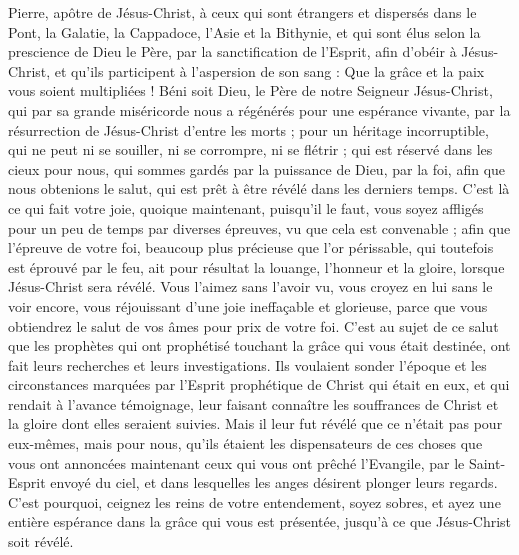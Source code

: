 \begin{multicols}{2}
\TextTitle{[Introduction]}
\VerseOne{}Pierre, apôtre de Jésus-Christ, à ceux qui sont étrangers et dispersés dans le Pont{}, la Galatie, la Cappadoce, l’Asie et la Bithynie,
et qui sont élus selon la prescience de Dieu le Père, par la sanctification de l’Esprit, afin d’obéir à Jésus-Christ, et qu’ils participent à l'aspersion de son sang : Que la grâce et la paix vous soient multipliées !
Béni soit Dieu, le Père de notre Seigneur Jésus-Christ, qui par sa grande miséricorde nous a régénérés pour une espérance vivante, par la résurrection de Jésus-Christ d'entre les morts ;
pour un héritage incorruptible, qui ne peut ni se souiller, ni se corrompre, ni se flétrir ; qui est réservé dans les cieux pour nous,
qui sommes gardés par la puissance de Dieu, par la foi, afin que nous obtenions le salut, qui est prêt à être révélé dans les derniers temps.
C’est là ce qui fait votre joie, quoique maintenant, puisqu’il le faut, vous soyez affligés pour un peu de temps par diverses épreuves, vu que cela est convenable ;
afin que l'épreuve de votre foi, beaucoup plus précieuse que l'or périssable, qui toutefois est éprouvé par le feu, ait pour résultat la louange, l’honneur et la gloire, lorsque Jésus-Christ sera révélé.
Vous l’aimez sans l’avoir vu, vous croyez en lui sans le voir encore, vous réjouissant d’une joie ineffaçable et glorieuse,
parce que vous obtiendrez le salut de vos âmes pour prix de votre foi.
C’est au sujet de ce salut que les prophètes qui ont prophétisé touchant la grâce qui vous était destinée, ont fait leurs recherches et leurs investigations.
Ils voulaient sonder l’époque et les circonstances marquées par l'Esprit prophétique de Christ qui était en eux, et qui rendait à l’avance témoignage, leur faisant connaître les souffrances de Christ et la gloire dont elles seraient suivies.
Mais il leur fut révélé que ce n'était pas pour eux-mêmes, mais pour nous, qu'ils étaient les dispensateurs de ces choses que vous ont annoncées maintenant ceux qui vous ont prêché l'Evangile, par le Saint-Esprit envoyé du ciel, et dans lesquelles les anges désirent plonger leurs regards.
C’est pourquoi, ceignez les reins de votre entendement, soyez sobres, et ayez une entière espérance dans la grâce qui vous est présentée, jusqu'à ce que Jésus-Christ soit révélé{}.

\end{multicols}
